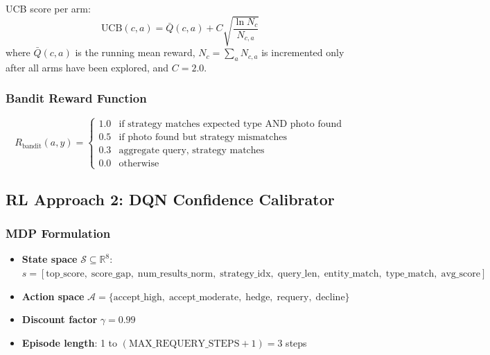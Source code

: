 \documentclass[11pt,letterpaper]{article}
\begin{document}
UCB score per arm:
\begin{equation}
  \text{UCB}(c, a) = \bar{Q}(c, a) + C \sqrt{\frac{\ln N_c}{N_{c,a}}}
\end{equation}
where $\bar{Q}(c,a)$ is the running mean reward, $N_c = \sum_a N_{c,a}$ is incremented only after all arms have been explored, and $C = 2.0$.

\subsubsection{Bandit Reward Function}

\begin{equation}
  R_{\text{bandit}}(a, y) = \begin{cases}
    1.0 & \text{if strategy matches expected type AND photo found} \\
    0.5 & \text{if photo found but strategy mismatches} \\
    0.3 & \text{aggregate query, strategy matches} \\
    0.0 & \text{otherwise}
  \end{cases}
\end{equation}

\subsection{RL Approach 2: DQN Confidence Calibrator}
\label{sec:dqn}

\subsubsection{MDP Formulation}

\begin{itemize}[nosep]
  \item \textbf{State space} $\mathcal{S} \subseteq \mathbb{R}^8$:
    $s = [\text{top\_score},\; \text{score\_gap},\; \text{num\_results\_norm},\; \text{strategy\_idx},\; \text{query\_len},\; \text{entity\_match},\; \text{type\_match},\; \text{avg\_score}]$
  \item \textbf{Action space} $\mathcal{A} = \{\text{accept\_high},\; \text{accept\_moderate},\; \text{hedge},\; \text{requery},\; \text{decline}\}$
  \item \textbf{Discount factor} $\gamma = 0.99$
  \item \textbf{Episode length}: 1 to $(\text{MAX\_REQUERY\_STEPS} + 1) = 3$ steps
\end{itemize}
\end{document}
